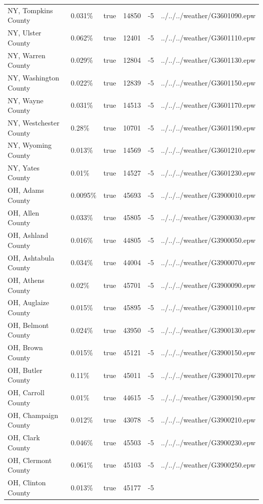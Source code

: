 \begin{longtable}[]{@{}llllll@{}}
NY, Tompkins County & 0.031\% & true & 14850 & -5 &
../../../weather/G3601090.epw \\
NY, Ulster County & 0.062\% & true & 12401 & -5 &
../../../weather/G3601110.epw \\
NY, Warren County & 0.029\% & true & 12804 & -5 &
../../../weather/G3601130.epw \\
NY, Washington County & 0.022\% & true & 12839 & -5 &
../../../weather/G3601150.epw \\
NY, Wayne County & 0.031\% & true & 14513 & -5 &
../../../weather/G3601170.epw \\
NY, Westchester County & 0.28\% & true & 10701 & -5 &
../../../weather/G3601190.epw \\
NY, Wyoming County & 0.013\% & true & 14569 & -5 &
../../../weather/G3601210.epw \\
NY, Yates County & 0.01\% & true & 14527 & -5 &
../../../weather/G3601230.epw \\
OH, Adams County & 0.0095\% & true & 45693 & -5 &
../../../weather/G3900010.epw \\
OH, Allen County & 0.033\% & true & 45805 & -5 &
../../../weather/G3900030.epw \\
OH, Ashland County & 0.016\% & true & 44805 & -5 &
../../../weather/G3900050.epw \\
OH, Ashtabula County & 0.034\% & true & 44004 & -5 &
../../../weather/G3900070.epw \\
OH, Athens County & 0.02\% & true & 45701 & -5 &
../../../weather/G3900090.epw \\
OH, Auglaize County & 0.015\% & true & 45895 & -5 &
../../../weather/G3900110.epw \\
OH, Belmont County & 0.024\% & true & 43950 & -5 &
../../../weather/G3900130.epw \\
OH, Brown County & 0.015\% & true & 45121 & -5 &
../../../weather/G3900150.epw \\
OH, Butler County & 0.11\% & true & 45011 & -5 &
../../../weather/G3900170.epw \\
OH, Carroll County & 0.01\% & true & 44615 & -5 &
../../../weather/G3900190.epw \\
OH, Champaign County & 0.012\% & true & 43078 & -5 &
../../../weather/G3900210.epw \\
OH, Clark County & 0.046\% & true & 45503 & -5 &
../../../weather/G3900230.epw \\
OH, Clermont County & 0.061\% & true & 45103 & -5 &
../../../weather/G3900250.epw \\
OH, Clinton County & 0.013\% & true & 45177 & -5 &

\end{longtable}
